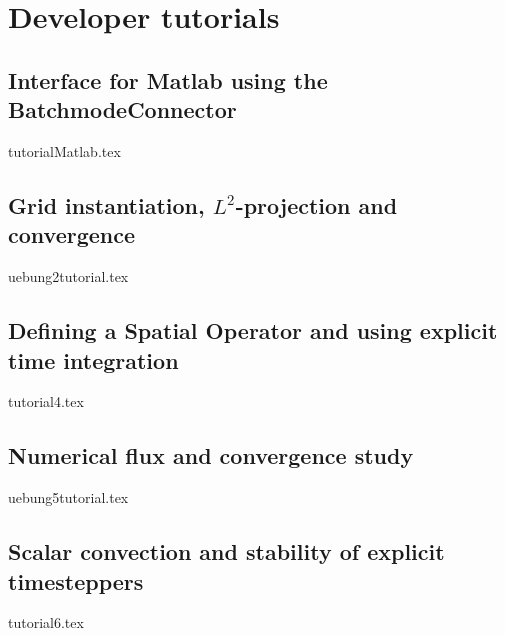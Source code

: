\documentclass[a4paper,10pt]{report} %
\begin{document}
\part{Developer tutorials}
\label{sec:Tutorial}

\chapter{Interface for Matlab using the BatchmodeConnector}
\label{Matlab}
{tutorialMatlab.tex}

\chapter{Grid instantiation, $L^2$-projection and convergence}
\label{GridInstantiation}
{uebung2tutorial.tex}

\chapter{Defining a Spatial Operator and using explicit time integration}
\label{SpatialOperator}
{tutorial4.tex}


\chapter{Numerical flux and convergence study}
\label{NumFlux}
{uebung5tutorial.tex}


\chapter{Scalar convection and stability of explicit timesteppers}
\label{ScalarAdvection}
{tutorial6.tex}
\end{document}
